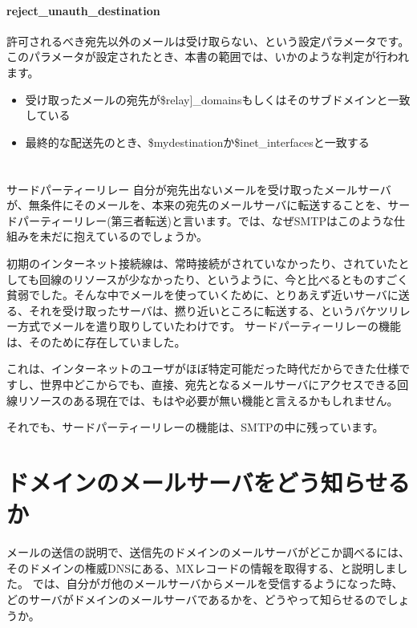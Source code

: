 \paragraph{reject\_unauth\_destination}
許可されるべき宛先以外のメールは受け取らない、という設定パラメータです。このパラメータが設定されたとき、本書の範囲では、いかのような判定が行われます。

\begin{itemize}
  \item 受け取ったメールの宛先が\$relay]\_domainsもしくはそのサブドメインと一致している
  \item 最終的な配送先のとき、\$mydestinationか\$inet\_interfacesと一致する
\end{itemize}

\section*{}
\begin{itembox}[l]{サードパーティーリレー}
自分が宛先出ないメールを受け取ったメールサーバが、無条件にそのメールを、本来の宛先のメールサーバに転送することを、サードパーティーリレー(第三者転送)と言います。では、なぜSMTPはこのような仕組みを未だに抱えているのでしょうか。

初期のインターネット接続線は、常時接続がされていなかったり、されていたとしても回線のリソースが少なかったり、というように、今と比べるとものすごく貧弱でした。そんな中でメールを使っていくために、とりあえず近いサーバに送る、それを受け取ったサーバは、撚り近いところに転送する、というバケツリレー方式でメールを遣り取りしていたわけです。
サードパーティーリレーの機能は、そのために存在していました。

これは、インターネットのユーザがほぼ特定可能だった時代だからできた仕様ですし、世界中どこからでも、直接、宛先となるメールサーバにアクセスできる回線リソースのある現在では、もはや必要が無い機能と言えるかもしれません。

それでも、サードパーティーリレーの機能は、SMTPの中に残っています。

\end{itembox}


\section{ドメインのメールサーバをどう知らせるか}
メールの送信の説明で、送信先のドメインのメールサーバがどこか調べるには、そのドメインの権威DNSにある、MXレコードの情報を取得する、と説明しました。
では、自分がガ他のメールサーバからメールを受信するようになった時、どのサーバがドメインのメールサーバであるかを、どうやって知らせるのでしょうか。

